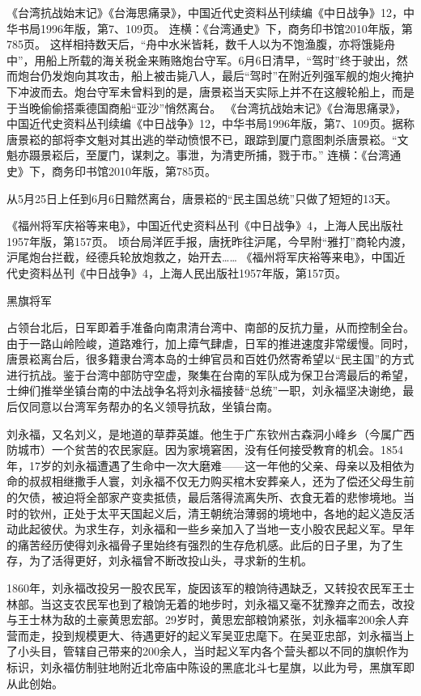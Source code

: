 \documentclass[12pt,UTF8]{ctexbook}
\begin{document}
《台湾抗战始末记》《台海思痛录》，中国近代史资料丛刊续编《中日战争》12，中华书局1996年版，第7、109页。
连横：《台湾通史》下，商务印书馆2010年版，第785页。
这样相持数天后，“舟中水米皆耗，数千人以为不饱渔腹，亦将饿毙舟中”，用船上所载的海关税金来贿赂炮台守军。6月6日清早，“驾时”终于驶出，然而炮台仍发炮向其攻击，船上被击毙八人，最后“驾时”在附近列强军舰的炮火掩护下冲波而去。炮台守军未曾料到的是，唐景崧当天实际上并不在这艘轮船上，而是于当晚偷偷搭乘德国商船“亚沙”悄然离台。 《台湾抗战始末记》《台海思痛录》，中国近代史资料丛刊续编《中日战争》12，中华书局1996年版，第7、109页。据称唐景崧的部将李文魁对其出逃的举动愤恨不已，跟踪到厦门意图刺杀唐景崧。“文魁亦蹑景崧后，至厦门，谋刺之。事泄，为清吏所捕，戮于市。” 连横：《台湾通史》下，商务印书馆2010年版，第785页。

从5月25日上任到6月6日黯然离台，唐景崧的“民主国总统”只做了短短的13天。

《福州将军庆裕等来电》，中国近代史资料丛刊《中日战争》4，上海人民出版社1957年版，第157页。
顷台局洋匠手报，唐抚昨往沪尾，今早附“雅打”商轮内渡，沪尾炮台拦截，经德兵轮放炮救之，始开去…… 《福州将军庆裕等来电》，中国近代史资料丛刊《中日战争》4，上海人民出版社1957年版，第157页。

黑旗将军

占领台北后，日军即着手准备向南肃清台湾中、南部的反抗力量，从而控制全台。由于一路山岭险峻，道路难行，加上瘴气肆虐，日军的推进速度非常缓慢。同时，唐景崧离台后，很多籍隶台湾本岛的士绅官员和百姓仍然寄希望以“民主国”的方式进行抗战。鉴于台湾中部防守空虚，聚集在台南的军队成为保卫台湾最后的希望，士绅们推举坐镇台南的中法战争名将刘永福接替“总统”一职，刘永福坚决谢绝，最后仅同意以台湾军务帮办的名义领导抗敌，坐镇台南。

刘永福，又名刘义，是地道的草莽英雄。他生于广东钦州古森洞小峰乡（今属广西防城市）一个贫苦的农民家庭。因为家境窘困，没有任何接受教育的机会。1854年，17岁的刘永福遭遇了生命中一次大磨难——这一年他的父亲、母亲以及相依为命的叔叔相继撒手人寰，刘永福不仅无力购买棺木安葬亲人，还为了偿还父母生前的欠债，被迫将全部家产变卖抵债，最后落得流离失所、衣食无着的悲惨境地。当时的钦州，正处于太平天国起义后，清王朝统治薄弱的境地中，各地的起义造反活动此起彼伏。为求生存，刘永福和一些乡亲加入了当地一支小股农民起义军。早年的痛苦经历使得刘永福骨子里始终有强烈的生存危机感。此后的日子里，为了生存，为了活得更好，刘永福曾不断改投山头，寻求新的生机。

1860年，刘永福改投另一股农民军，旋因该军的粮饷待遇缺乏，又转投农民军王士林部。当这支农民军也到了粮饷无着的地步时，刘永福又毫不犹豫弃之而去，改投与王士林为敌的土豪黄思宏部。29岁时，黄思宏部粮饷紧张，刘永福率200余人弃营而走，投到规模更大、待遇更好的起义军吴亚忠麾下。在吴亚忠部，刘永福当上了小头目，管辖自己带来的200余人，当时起义军内各个营头都以不同的旗帜作为标识，刘永福仿制驻地附近北帝庙中陈设的黑底北斗七星旗，以此为号，黑旗军即从此创始。
\end{document}
